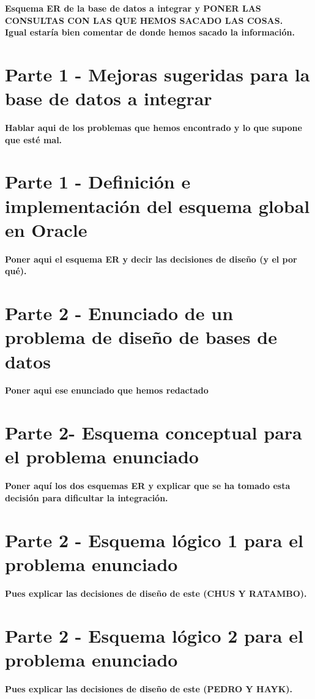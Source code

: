 \documentclass{article}
\begin{document}
\textbf{Esquema ER de la base de datos a integrar y PONER LAS CONSULTAS CON LAS QUE HEMOS SACADO LAS COSAS.}\\
\textbf{Igual estaría bien comentar de donde hemos sacado la información.}

\section{Parte 1 - Mejoras sugeridas para la base de datos a integrar}

\textbf{Hablar aqui de los problemas que hemos encontrado y lo que supone que esté mal.}

\section{Parte 1 - Definición e implementación del esquema global en Oracle}

\textbf{Poner aqui el esquema ER y decir las decisiones de diseño (y el por qué).}

\section{Parte 2 - Enunciado de un problema de diseño de bases de datos}

\textbf{Poner aqui ese enunciado que hemos redactado}

\section{Parte 2- Esquema conceptual para el problema enunciado}

\textbf{Poner aquí los dos esquemas ER y explicar que se ha tomado esta decisión para dificultar la integración.}

\section{Parte 2 - Esquema lógico 1 para el problema enunciado}

\textbf{Pues explicar las decisiones de diseño de este (CHUS Y RATAMBO).}

\section{Parte 2 - Esquema lógico 2 para el problema enunciado}

\textbf{Pues explicar las decisiones de diseño de este (PEDRO Y HAYK).}
\end{document}

